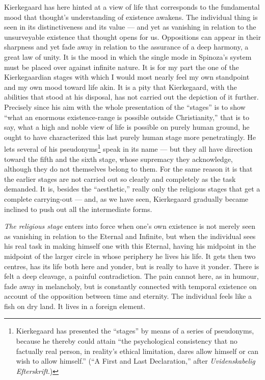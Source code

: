 \documentclass[12pt,a4paper]{book}
\newcommand{\opage}[1]{\marginnote{\footnotesize\textit{[#1]}}}
\begin{document}
Kierkegaard has here hinted at a view of life that corresponds to the fundamental mood that
thought's understanding of existence awakens. The individual thing is seen in its distinctiveness
and its value --- and yet as vanishing in relation to the unsurveyable existence that thought
opens for us. Oppositions can appear in their sharpness and yet fade away in relation to the
assurance of a deep harmony, a great law of unity. It is the mood in which the single mode in
Spinoza's system must be placed over against infinite nature. It is for my part the one of the
Kierkegaardian stages with which I would \opage{161}most nearly feel my own standpoint and my own mood
toward life akin. It is a pity that Kierkegaard, with the abilities that stood at his disposal,
has not carried out the depiction of it further. Precisely since his aim with the whole
presentation of the ``stages'' is to show ``what an enormous existence-range is possible outside
Christianity,'' that is to say, what a high and noble view of life is possible on purely human
ground, he ought to have characterized this last purely human stage more penetratingly. He lets
several of his pseudonyms\footnote{Kierkegaard has presented the ``stages'' by means of a series
of pseudonyms, because he thereby could attain ``the psychological consistency that no factually
real person, in reality's ethical limitation, dares allow himself or can wish to allow himself.''
(``A First and Last Declaration,'' after \emph{Uvidenskabelig Efterskrift}.)} speak in its name
--- but they all have direction toward the fifth and the sixth stage, whose supremacy they
acknowledge, although they do not themselves belong to them. For the same reason it is that the
earlier stages are not carried out so clearly and completely as the task demanded. It is,
besides the ``aesthetic,'' really only the religious stages that get a complete carrying-out ---
and, as we have seen, Kierkegaard gradually became inclined to push out all the intermediate
forms.

\emph{The religious stage} enters into force when one's own existence is not merely seen as
vanishing in relation to the Eternal and Infinite, but when the individual sees his real task
in making himself one with this Eternal, having his midpoint in the midpoint of the larger circle
in whose periphery he lives his life. It gets then two centres, has its life both here and yonder,
but is really to have it yonder. There is felt a deep cleavage, a painful contradiction. The pain
cannot here, as in humour, fade away in melancholy, but is constantly connected with temporal
existence on account of the opposition between time and eternity. The individual feels like a fish
on dry land. It lives in a foreign element.
\end{document}
